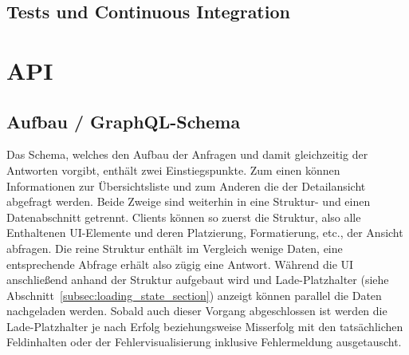 \subsection{Tests und Continuous Integration}


\section{API}

\subsection{Aufbau / GraphQL-Schema}\label{subsec:grapql_schema}
Das Schema, welches den Aufbau der Anfragen und damit gleichzeitig der Antworten vorgibt, enthält zwei Einstiegspunkte. Zum einen können Informationen zur Übersichtsliste und zum Anderen die der Detailansicht abgefragt werden. Beide Zweige sind weiterhin in eine Struktur- und einen Datenabschnitt getrennt. Clients können so zuerst die Struktur, also alle Enthaltenen UI-Elemente und deren Platzierung, Formatierung, etc., der Ansicht abfragen. Die reine Struktur enthält im Vergleich wenige Daten, eine entsprechende Abfrage erhält also zügig eine Antwort. Während die UI anschließend anhand der Struktur aufgebaut wird und Lade-Platzhalter (siehe Abschnitt~\ref{subsec:loading_state_section}) anzeigt können parallel die Daten nachgeladen werden. Sobald auch dieser Vorgang abgeschlossen ist werden die Lade-Platzhalter je nach Erfolg beziehungsweise Misserfolg mit den tatsächlichen Feldinhalten oder der Fehlervisualisierung inklusive Fehlermeldung ausgetauscht.

